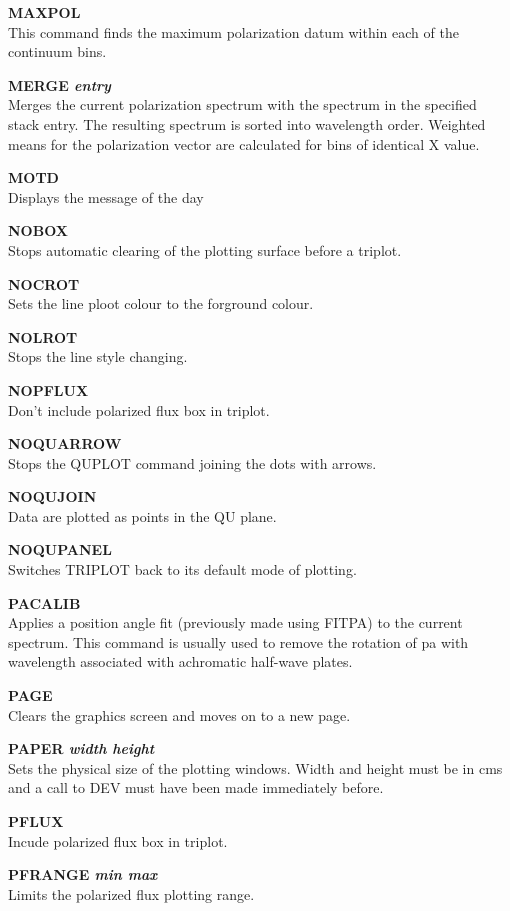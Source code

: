 {\bf MAXPOL} \\
This command finds the maximum polarization datum within each of the
continuum bins.

{\bf MERGE \it entry} \\
Merges the current polarization spectrum with the spectrum in the specified
stack entry. The resulting spectrum is sorted into wavelength order. Weighted
means for the polarization vector are calculated for bins of identical X value.

{\bf MOTD} \\
Displays the message of the day

{\bf NOBOX} \\
Stops automatic clearing of the plotting surface before a triplot.

{\bf NOCROT} \\
Sets the line ploot colour to the forground colour.

{\bf NOLROT} \\
Stops the line style changing.

{\bf NOPFLUX} \\
Don't include polarized flux box in triplot.

{\bf NOQUARROW} \\
Stops the QUPLOT command joining the dots with arrows.

{\bf NOQUJOIN} \\
Data are plotted as points in the QU plane.

{\bf NOQUPANEL} \\
Switches TRIPLOT back to its default mode of plotting.

{\bf PACALIB} \\
Applies a position angle fit (previously made using FITPA) to the current
spectrum. This command is usually used to remove the rotation of pa with
wavelength associated with achromatic half-wave plates.

{\bf PAGE} \\
Clears the graphics screen and moves on to a new page.

{\bf PAPER \it width height} \\
Sets the physical size of the plotting windows. Width and height must be
in cms and a call to DEV must have been made immediately before.

{\bf PFLUX} \\
Incude polarized flux box in triplot.

{\bf PFRANGE \it  min max } \\
Limits the polarized flux plotting range.


